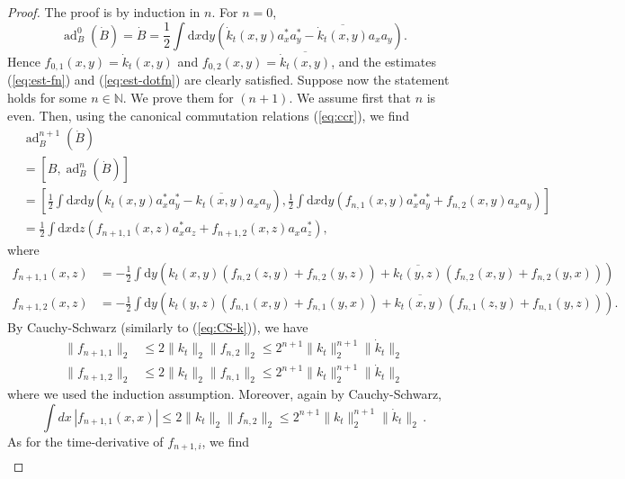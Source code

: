 \documentclass[11pt,a4paper,DIV11]{scrartcl}	%
\newcommand{\bN}{{\mathbb N}}
\newcommand{\ad}{\operatorname{ad}}	%
\newcommand{\di}{\textrm{d}}		%
\newcommand{\cc}[1]{\overline{#1}}	%
\newcommand{\norm}[1]{\lVert#1\rVert}	%
\newcommand{\be}[1]{\begin{equation}\label{eq:#1}}	%
\newcommand{\bd}{\begin{displaymath}}			%
\newcommand{\ed}{\end{displaymath}}
\begin{document}
\begin{proof} The proof is by induction in $n$. For $n = 0$,
\bd
\ad^0_B(\dot B) = \dot B = \frac{1}{2}\int \di x\di y\left( \dot k_t (x,y) a^\ast_x a^\ast_y - \cc{\dot k_t (x,y)} a_x a_y \right).
\ed
Hence $f_{0,1} (x,y) = \dot{k}_t (x,y)$ and $f_{0,2} (x,y) = \cc{\dot{k}_t (x,y)}$, and the estimates (\ref{eq:est-fn}) and (\ref{eq:est-dotfn}) are clearly satisfied. Suppose now the statement holds for some $n \in \bN$. 
We prove them for $(n+1)$. We assume first that $n$ is even. Then, using the canonical commutation relations (\ref{eq:ccr}), we find
\begin{align*}
& \ad^{n+1}_B(\dot B) \\ & = [B,\ad^n_B(\dot B)] \\
& = \left[\frac{1}{2} \int \di x\di y\left( k_t (x,y)a^\ast_x a^\ast_y - \cc{k_t (x,y)}a_x a_y \right), \frac{1}{2}\int \di x\di y\left( f_{n,1}(x,y) a^\ast_x a^\ast_y + f_{n,2}(x,y) a_x a_y \right)\right] \\
& = \frac{1}{2} \int \di x\di z \left(f_{n+1,1}(x,z) a^\ast_x a_z + f_{n+1,2}(x,z) a_x a^\ast_z \right),
\end{align*}
where
\begin{equation}
\label{eq:even}
\begin{split}
f_{n+1,1}(x,z) & = -\frac{1}{2} \int \di y \left( k_t (x,y) \left( f_{n,2}(z,y) + f_{n,2}(y,z) \right) + \cc{k_t (y,z)}\left( f_{n,2}(x,y) + f_{n,2}(y,x)\right) \right)\\
f_{n+1,2}(x,z) & = -\frac{1}{2} \int \di y \left( k_t (y,z) \left( f_{n,1}(x,y) + f_{n,1}(y,x) \right) + \cc{k_t (x,y)}\left( f_{n,1}(z,y) + f_{n,1}(y,z)\right) \right) .
\end{split}
\end{equation}
By Cauchy-Schwarz (similarly to (\ref{eq:CS-k})), we have
\be{normnorm}
\begin{split}
\norm{f_{n+1,1}}_{2} & \leq 2 \| k_t  \|_2 \| f_{n,2} \|_2 \leq 2^{n+1} \| k_t \|^{n+1}_2 \| \dot k_t \|_2 \\
\| f_{n+1 ,2} \|_2 & \leq 2 \| k_t \|_2 \| f_{n,1} \|_2 \leq 2^{n+1} \| k_t \|^{n+1}_2 \| \dot k_t \|_2
\end{split} 
\end{equation}
where we used the induction assumption. Moreover, again by Cauchy-Schwarz,
\[ \int dx \, |f_{n+1 ,1} (x,x)|  \leq 2 \| k_t \|_2 \| f_{n,2} \|_2 \leq 2^{n+1} \| k_t \|^{n+1}_2 \| \dot k_t \|_2 \,. \]
As for the time-derivative of $f_{n+1,i}$, we find
\[ \begin{split}

\end{split}\]
\end{proof}
\end{document}
